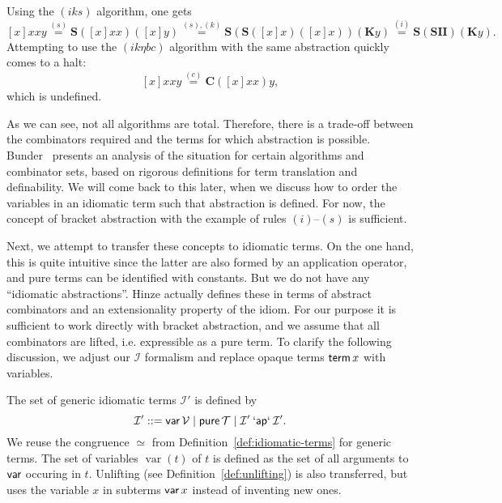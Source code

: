 \begin{example}\label{exmp:bracket-abs}
Using the $(iks)$ algorithm, one gets
\[ [x]xxy \stackrel{(s)}{=} \mathbf{S}([x]xx)([x]y)
	\stackrel{(s),(k)}{=} \mathbf{S}(\mathbf{S}([x]x)([x]x))(\mathbf{K}y)
	\stackrel{(i)}{=} \mathbf{S}(\mathbf{SII})(\mathbf{K}y). \]
Attempting to use the $(ik\eta bc)$ algorithm with the same abstraction
quickly comes to a halt:
\[ [x]xxy \stackrel{(c)}{=} \mathbf{C}([x]xx)y, \]
which is undefined.
\end{example}

As we can see, not all algorithms are total.
Therefore, there is a trade-off between the combinators required and the terms
for which abstraction is possible.
Bunder~\cite{bunder96} presents an analysis of the situation for certain
algorithms and combinator sets, based on rigorous definitions for term
translation and definability.
We will come back to this later, when we discuss how to order the variables in
an idiomatic term such that abstraction is defined.
For now, the concept of bracket abstraction with the example of rules
$(i)$--$(s)$ is sufficient.

Next, we attempt to transfer these concepts to idiomatic terms.
On the one hand, this is quite intuitive since the latter are also formed by
an application operator, and pure terms can be identified with constants.
But we do not have any ``idiomatic abstractions''.
Hinze actually defines these in terms of abstract combinators and an
extensionality property of the idiom.
For our purpose it is sufficient to work directly with bracket abstraction,
and we assume that all combinators are lifted, i.e. expressible as a pure term.
To clarify the following discussion, we adjust our $\mathcal{I}$ formalism
and replace opaque terms $\operatorname{\mathsf{term}} x$ with variables.

\begin{definition}
The set of generic idiomatic terms $\mathcal{I}'$ is defined by
\begin{equation}
	\mathcal{I}' ::= \operatorname{\mathsf{var}} \mathcal{V} \mid \operatorname{\mathsf{pure}} \mathcal{T} \mid
		\mathcal{I}' \mathbin{\mathsf{`ap`}} \mathcal{I}'.
\end{equation}
We reuse the congruence $\simeq$ from Definition~\ref{def:idiomatic-terms} for
generic terms.
The set of variables $\operatorname{var}(t)$ of $t$ is defined as the set of
all arguments to $\operatorname{\mathsf{var}}$ occuring in $t$.
Unlifting (see Definition~\ref{def:unlifting}) is also transferred, but uses
the variable $x$ in subterms $\operatorname{\mathsf{var}} x$ instead of inventing new ones.
\end{definition}

